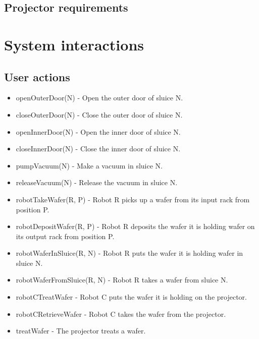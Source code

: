 \documentclass[12pt]{report}
\begin{document}
	\section{Projector requirements}
	\begin{itemize}
	\end{itemize}
	
	\chapter{System interactions}
	\section{User actions}
	\begin{itemize}
\item openOuterDoor(N) - Open the outer door of sluice N.
\item closeOuterDoor(N) - Close the outer door of sluice N.
\item openInnerDoor(N) - Open the inner door of sluice N.
\item closeInnerDoor(N) - Close the inner door of sluice N.
\item pumpVacuum(N) - Make a vacuum in sluice N.
\item releaseVacuum(N) - Release the vacuum in sluice N.
\item robotTakeWafer(R, P) - Robot R picks up a wafer from its input rack from position P.
\item robotDepositWafer(R, P) - Robot R deposits the wafer it is holding wafer on its output rack from position P.
\item robotWaferInSluice(R, N) - Robot R puts the wafer it is holding wafer in sluice N.
\item robotWaferFromSluice(R, N) - Robot R takes a wafer from sluice N.
\item robotCTreatWafer - Robot C puts the wafer it is holding on the projector.
\item robotCRetrieveWafer - Robot C takes the wafer from the projector.
\item treatWafer - The projector treats a wafer.
\end{itemize}
\end{document}
